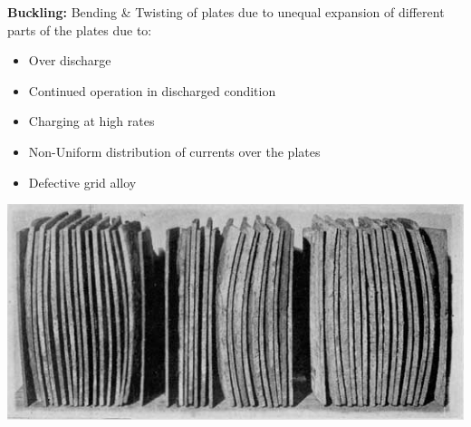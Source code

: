 \documentclass{beamer}
\begin{document}
{ %
    \begin{frame}[plain]
     \end{frame}
}

\begin{frame}     %
  \fontsize{8pt}{14}\selectfont
  
  \textbf{Buckling:} Bending \& Twisting of plates due to unequal expansion of different parts of the plates due to:
  \begin{itemize}
    \item Over discharge
    \item Continued operation in discharged condition
    \item Charging at high rates
    \item Non-Uniform distribution of currents over the plates
    \item Defective grid alloy
  \end{itemize}
  
  \begin{center}
    \includegraphics[width=0.8\linewidth]{./Resources/Images/buckling.jpg}
  \end{center}
\end{frame}
\end{document}
